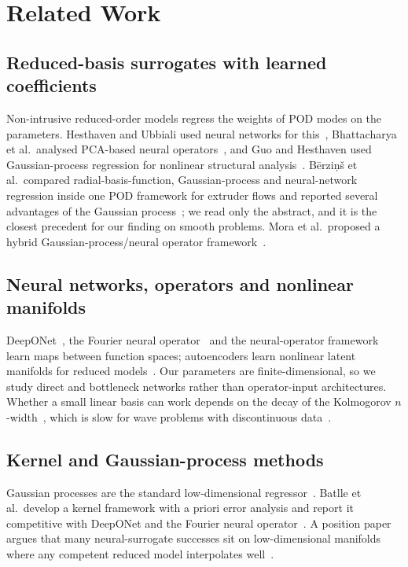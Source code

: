 \section{Related Work}\label{sec:related}
\subsection{Reduced-basis surrogates with learned coefficients}
Non-intrusive reduced-order models regress the weights of POD modes on the parameters. Hesthaven and Ubbiali used neural networks for this~\cite{hesthaven2018}, Bhattacharya et al.\ analysed PCA-based neural operators~\cite{bhattacharya2021}, and Guo and Hesthaven used Gaussian-process regression for nonlinear structural analysis~\cite{guo2018}. B\={e}rzi\c{n}\v{s} et al.\ compared radial-basis-function, Gaussian-process and neural-network regression inside one POD framework for extruder flows and reported several advantages of the Gaussian process~\cite{berzins2020}; we read only the abstract, and it is the closest precedent for our finding on smooth problems. Mora et al.\ proposed a hybrid Gaussian-process/neural operator framework~\cite{mora2025}.

\subsection{Neural networks, operators and nonlinear manifolds}
DeepONet~\cite{lu2021}, the Fourier neural operator~\cite{li2021} and the neural-operator framework~\cite{kovachki2023} learn maps between function spaces; autoencoders learn nonlinear latent manifolds for reduced models~\cite{lee2020,fresca2022,franco2023}. Our parameters are finite-dimensional, so we study direct and bottleneck networks rather than operator-input architectures. Whether a small linear basis can work depends on the decay of the Kolmogorov $n$-width~\cite{cohen2015}, which is slow for wave problems with discontinuous data~\cite{greif2019}.

\subsection{Kernel and Gaussian-process methods}
Gaussian processes are the standard low-dimensional regressor~\cite{rasmussen2006}. Batlle et al.\ develop a kernel framework with a priori error analysis and report it competitive with DeepONet and the Fourier neural operator~\cite{batlle2024}. A position paper argues that many neural-surrogate successes sit on low-dimensional manifolds where any competent reduced model interpolates well~\cite{duraisamy2026}.

